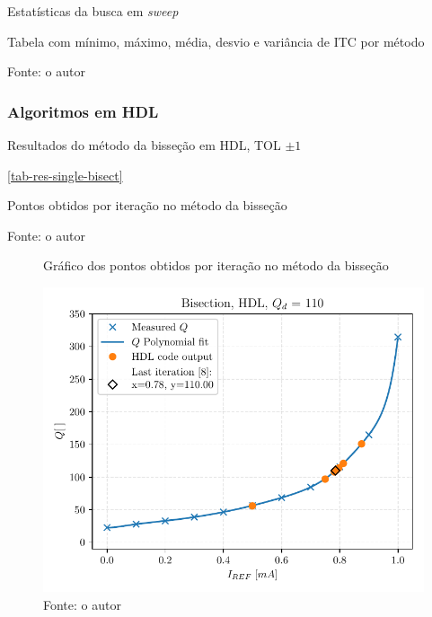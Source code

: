 \begin{frame}{Estatísticas da busca em \textit{sweep}}

\begin{table}[H]
    \centering
    \caption{Tabela com mínimo, máximo, média, desvio e variância de ITC por método}
        
 \caption*{Fonte: o autor}
    \label{tab-stats-sweep-low-tol}
\end{table}
    
\end{frame}

\subsubsection{Algoritmos em HDL}

\begin{frame}[standout]

Resultados do método da bisseção em HDL, TOL $\pm 1$
    
\end{frame}

\begin{frame}{\autoref{tab-res-single-bisect}}


\begin{multicols}{2}

\begin{table}[H]
    \centering
    \caption{Pontos obtidos por iteração no método da bisseção}
        
        \caption*{Fonte: o autor}
    \label{tab-res-single-bisect}
\end{table}
\vfill
\begin{figure}[H]
    \centering
    \caption{Gráfico dos pontos obtidos por iteração no método da bisseção}
    \includegraphics[width=.4\textwidth]{fig/res-bisect-single-hdl.pdf}
     \caption*{Fonte: o autor}
    \label{f-res-single-bisect}
\end{figure}
\end{multicols}
    
\end{frame}

